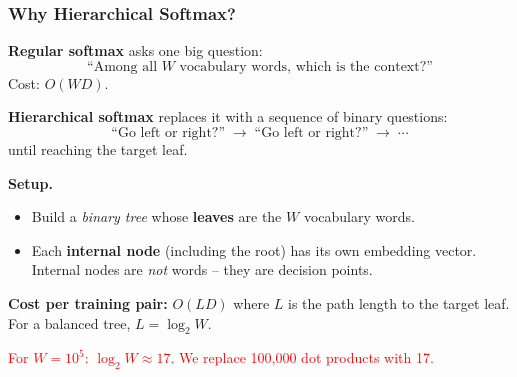 \documentclass[notes,11pt, aspectratio=169]{beamer}
\begin{document}
\begin{frame}
\frametitle{Why Hierarchical Softmax?}

\textbf{Regular softmax} asks one big question:
\[
    \text{``Among all $W$ vocabulary words, which is the context?''}
\]
Cost: $O(W D)$.

\vspace{8pt}
\textbf{Hierarchical softmax} replaces it with a sequence of binary questions:
\[
    \text{``Go left or right?''} \;\to\; \text{``Go left or right?''} \;\to\; \cdots
\]
until reaching the target leaf.

\vspace{8pt}
\textbf{Setup.}
\begin{itemize}
    \item Build a \emph{binary tree} whose \textbf{leaves} are the $W$ vocabulary words.
    \item Each \textbf{internal node} (including the root) has its own embedding vector. \\
    Internal nodes are \emph{not} words -- they are decision points.
\end{itemize}

\vspace{6pt}
\textbf{Cost per training pair:} $O(L D)$ where $L$ is the path length to the target leaf. For a balanced tree, $L = \log_2 W$.

\vspace{4pt}
\textcolor{red}{For $W = 10^5$: $\log_2 W \approx 17$. We replace 100{,}000 dot products with 17.}
\end{frame}
\end{document}
